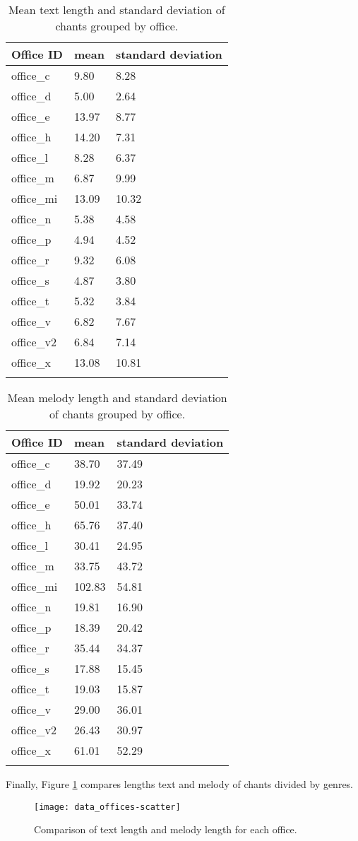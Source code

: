 \begin{longtable}{| p{} | p{} | p{} |}

\hline
Office ID & mean & standard deviation \\
\hline
office\_c & 9.80 & 8.28 \\
office\_d & 5.00 & 2.64 \\
office\_e & 13.97 & 8.77 \\
office\_h & 14.20 & 7.31 \\
office\_l & 8.28 & 6.37 \\
office\_m & 6.87 & 9.99 \\
office\_mi & 13.09 & 10.32 \\
office\_n & 5.38 & 4.58 \\
office\_p & 4.94 & 4.52 \\
office\_r & 9.32 & 6.08 \\
office\_s & 4.87 & 3.80 \\
office\_t & 5.32 & 3.84 \\
office\_v & 6.82 & 7.67 \\
office\_v2 & 6.84 & 7.14 \\
office\_x & 13.08 & 10.81 \\
\hline

\caption{Mean text length and standard deviation of chants grouped by office.}
\label{table:text_offices}
\end{longtable}

\begin{longtable}{| p{} | p{} | p{} |}
\hline
Office ID & mean & standard deviation \\
\hline
office\_c & 38.70 & 37.49 \\
office\_d & 19.92 & 20.23 \\
office\_e & 50.01 & 33.74 \\
office\_h & 65.76 & 37.40 \\
office\_l & 30.41 & 24.95 \\
office\_m & 33.75 & 43.72 \\
office\_mi & 102.83 & 54.81 \\
office\_n & 19.81 & 16.90 \\
office\_p & 18.39 & 20.42 \\
office\_r & 35.44 & 34.37 \\
office\_s & 17.88 & 15.45 \\
office\_t & 19.03 & 15.87 \\
office\_v & 29.00 & 36.01 \\
office\_v2 & 26.43 & 30.97 \\
office\_x & 61.01 & 52.29 \\
\hline

\caption{Mean melody length and standard deviation of chants grouped by office.}
\label{table:melody_offices}
\end{longtable}

Finally, Figure \ref{fig:offices-scatter} compares lengths text and melody of chants divided by genres.

\begin{figure}[h!]
\centering
\texttt{[image: data\_offices-scatter]}
\caption{Comparison of text length and melody length for each office.}
\label{fig:offices-scatter}
\end{figure}
